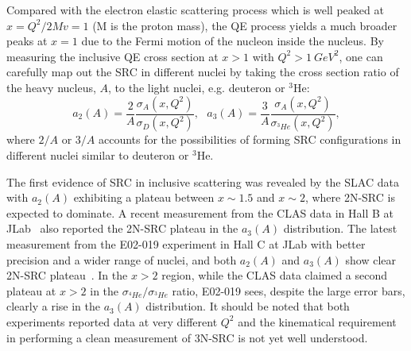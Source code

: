 Compared with the electron elastic scattering process which is well peaked at $x=Q^{2}/2Mv=1$ (M is the proton mass), the QE process yields a much
broader peaks at $x=1$ due to the Fermi motion of the nucleon inside the nucleus. By measuring the inclusive QE cross section at $x>1$ with
$Q^{2}>1~GeV^{2}$, one can carefully map out the SRC in different nuclei by taking the cross section ratio of the heavy nucleus, $A$, to the light
nuclei, e.g. deuteron or $\mathrm{^{3}He}$:
\begin{equation}
a_{2}(A) = \frac{2}{A}\frac{\sigma_{A}(x,Q^{2})}{\sigma_{D}(x,Q^{2})},~~~  a_3(A) = \frac{3}{A}\frac{\sigma_{A}(x,Q^{2})}{\sigma_{^{3}He}(x,Q^{2})},
\end{equation}
where $2/A$ or $3/A$ accounts for the possibilities of forming SRC configurations in different nuclei similar to deuteron or $\mathrm{^{3}He}$. 

The first evidence of SRC in inclusive scattering was revealed by the SLAC data~\cite{SLAC_Measurement_PRC.48.2451} with $a_2(A)$ exhibiting a
plateau between $x\sim1.5$ and $x\sim2$, where 2N-SRC is expected to dominate. A recent measurement from the CLAS data in Hall B at
JLab~\cite{PhysRevLett.96.082501} also reported the 2N-SRC plateau in the $a_3(A)$ distribution. The latest measurement from the E02-019
experiment in Hall C at JLab with better precision and a wider range of nuclei, and both $a_2(A)$ and $a_3(A)$ show clear 2N-SRC
plateau~\cite{PhysRevLett.105.212502}. In the $x>2$ region, while the CLAS data claimed a second plateau at $x>2$ in the
$\sigma_{^{4}He}/\sigma_{^{3}He}$ ratio, E02-019 sees, despite the large error bars, clearly a rise in the $a_3(A)$ distribution. It should be
noted that both experiments reported data at very different $Q^{2}$ and the kinematical requirement in performing a clean measurement of 3N-SRC is
not yet well understood.


